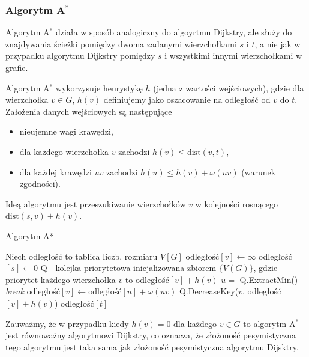 \subsubsection{Algorytm A\texorpdfstring{$^*$}{TEXT}}
Algorytm A$^*$ działa w sposób analogiczny do algoyrtmu Dijkstry, 
ale służy do znajdywania ścieżki pomiędzy dwoma zadanymi wierzchołkami
$s$ i $t$, a nie jak w przypadku algorytmu Dijkstry pomiędzy $s$
i wszystkimi innymi wierzchołkami w grafie.

Algorytm A$^*$ wykorzysuje heurystykę $h$ (jedna z wartości 
wejściowych), gdzie dla wierzchołka
$v \in G$, $h(v)$ definiujemy jako oszacowanie
na odległość od $v$ do $t$. Założenia danych wejściowych są następujące
\begin{itemize}
	\item nieujemne wagi krawędzi,
	\item dla każdego wierzchołka $v$ zachodzi $h(v) \leq \text{dist}(v, t)$,
	\item dla każdej krawędzi $uv$ zachodzi $h(u) \leq h(v) + \omega(uv)$ (warunek zgodności).
\end{itemize}
Ideą algorytmu jest przeszukiwanie wierzchołków $v$ w kolejności 
rosnącego $\text{dist}(s,v) + h(v)$.

\begin{algorithm}[H]
	\caption{Algorytm A*}
	\begin{algorithmic}[1]
		\State Niech odległość to tablica liczb, rozmiaru $V[G]$
		\State odległość$[v]\gets\infty$
		\EndFor
		\State odległość$[s]\gets 0$
		\State Q - kolejka priorytetowa inicjalizowana 
		zbiorem $\{V(G)\}$, gdzie priorytet każdego wierzchołka $v$
		to odległość$[v] + h(v)$
		\State $u =$ Q.ExtractMin()
		\State \textit{break}
		\EndIf
		\State $\text{odległość}[v] \gets \text{odległość}[u] + \omega(uv)$
		\State Q.DecreaseKey($v$, odległość$[v] + h(v)$)
		\EndIf
		\EndFor
		\EndWhile
		\State \Return odległość$[t]$
		\EndProcedure
	\end{algorithmic}
	\label{aStar_alg}
\end{algorithm}

Zauważmy, że w przypadku kiedy $h(v) = 0$ dla każdego $v \in G$ 
to algorytm A$^*$ jest równoważny algorytmowi Dijkstry, co oznacza, że
złożoność pesymistyczna tego algorytmu jest taka sama jak złożoność
pesymistyczna algorytmu Dijsktry.

